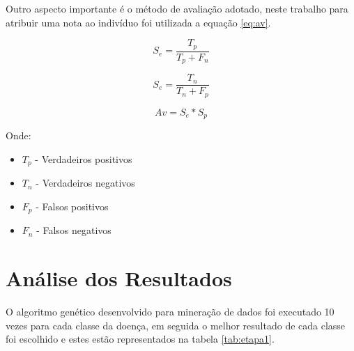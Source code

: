 \documentclass[11pt]{article}
\begin{document}
Outro aspecto importante é o método de avaliação adotado, neste trabalho
para atribuir uma nota ao indivíduo foi utilizada a equação \ref{eq:av}.

\begin{equation} \label{eq:se}
  S_e = \frac{T_p}{T_p +F_n}
\end{equation}

\begin{equation} \label{eq:sp}
  S_e = \frac{T_n}{T_n +F_p}
\end{equation}

\begin{equation} \label{eq:av}
  Av = S_e * S_p
\end{equation}

Onde:\newline
\begin{itemize}
    \item $T_p$ - Verdadeiros positivos\newline
    \item $T_n$ - Verdadeiros negativos\newline
    \item $F_p$ - Falsos positivos\newline
    \item $F_n$ - Falsos negativos\newline

\end{itemize}

\section{Análise dos Resultados}
\label{sec:resultados}

O algoritmo genético desenvolvido para mineração de dados foi executado 10 vezes
para cada classe da doença, em seguida o melhor resultado de cada classe foi
escolhido e estes estão representados na tabela \ref{tab:etapa1}.
\end{document}
